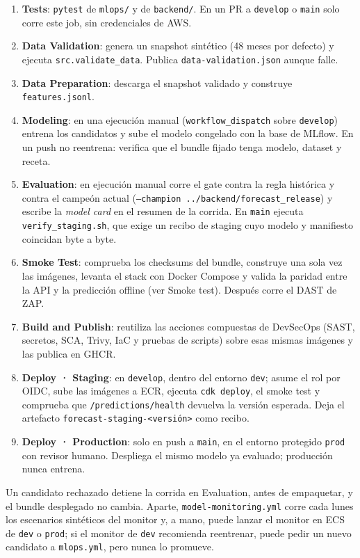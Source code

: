 \begin{enumerate}
    \item \textbf{Tests}: \texttt{pytest} de \texttt{mlops/} y de \texttt{backend/}. En un PR a \texttt{develop} o \texttt{main} solo corre este job, sin credenciales de AWS.
    \item \textbf{Data Validation}: genera un snapshot sintético (48 meses por defecto) y ejecuta \texttt{src.validate\_data}. Publica \texttt{data-validation.json} aunque falle.
    \item \textbf{Data Preparation}: descarga el snapshot validado y construye \texttt{features.jsonl}.
    \item \textbf{Modeling}: en una ejecución manual (\texttt{workflow\_dispatch} sobre \texttt{develop}) entrena los candidatos y sube el modelo congelado con la base de MLflow. En un push no reentrena: verifica que el bundle fijado tenga modelo, dataset y receta.
    \item \textbf{Evaluation}: en ejecución manual corre el gate contra la regla histórica y contra el campeón actual (\texttt{--champion ../backend/forecast\_release}) y escribe la \textit{model card} en el resumen de la corrida. En \texttt{main} ejecuta \texttt{verify\_staging.sh}, que exige un recibo de staging cuyo modelo y manifiesto coincidan byte a byte.
    \item \textbf{Smoke Test}: comprueba los checksums del bundle, construye una sola vez las imágenes, levanta el stack con Docker Compose y valida la paridad entre la API y la predicción offline (ver Smoke test). Después corre el DAST de ZAP.
    \item \textbf{Build and Publish}: reutiliza las acciones compuestas de DevSecOps (SAST, secretos, SCA, Trivy, IaC y pruebas de scripts) sobre esas mismas imágenes y las publica en GHCR.
    \item \textbf{Deploy · Staging}: en \texttt{develop}, dentro del entorno \texttt{dev}; asume el rol por OIDC, sube las imágenes a ECR, ejecuta \texttt{cdk deploy}, el smoke test y comprueba que \texttt{/predictions/health} devuelva la versión esperada. Deja el artefacto \texttt{forecast-staging-<versión>} como recibo.
    \item \textbf{Deploy · Production}: solo en push a \texttt{main}, en el entorno protegido \texttt{prod} con revisor humano. Despliega el mismo modelo ya evaluado; producción nunca entrena.
\end{enumerate}

Un candidato rechazado detiene la corrida en Evaluation, antes de empaquetar, y el bundle desplegado no cambia. Aparte, \texttt{model-monitoring.yml} corre cada lunes los escenarios sintéticos del monitor y, a mano, puede lanzar el monitor en ECS de \texttt{dev} o \texttt{prod}; si el monitor de \texttt{dev} recomienda reentrenar, puede pedir un nuevo candidato a \texttt{mlops.yml}, pero nunca lo promueve.

